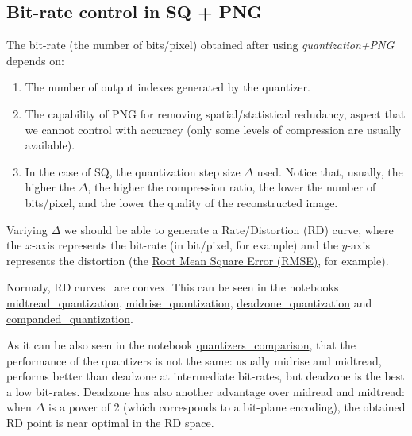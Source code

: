 
\subsection{Bit-rate control in SQ + PNG}

The bit-rate (the number of bits/pixel) obtained after using
\emph{quantization+PNG} depends on:
\begin{enumerate}
\item The number of output indexes generated by the quantizer.
\item The capability of PNG for removing spatial/statistical
  redudancy, aspect that we cannot control with accuracy (only some
  levels of compression are usually available).
\item In the case of SQ, the quantization step size $\Delta$
  used. Notice that, usually, the higher the $\Delta$, the higher the
  compression ratio, the lower the number of bits/pixel, and the lower
  the quality of the reconstructed image.
\end{enumerate}
Variying $\Delta$ we should be able to generate a Rate/Distortion (RD)
curve, where the $x$-axis represents the bit-rate (in bit/pixel, for
example) and the $y$-axis represents the distortion (the
\href{https://en.wikipedia.org/wiki/Root-mean-square_deviation}{Root
  Mean Square Error (RMSE)}, for example).

Normaly, RD curves~\cite{vruiz__information_theory} are convex. This
can be seen in the notebooks
\href{https://github.com/Sistemas-Multimedia/Sistemas-Multimedia.github.io/blob/master/contents/scalar_quantization/midtread.ipynb}{midtread\_quantization},
\href{https://github.com/Sistemas-Multimedia/Sistemas-Multimedia.github.io/blob/master/contents/scalar_quantization/midrise.ipynb}{midrise\_quantization},
\href{https://github.com/Sistemas-Multimedia/Sistemas-Multimedia.github.io/blob/master/contents/scalar_quantization/deadzone.ipynb}{deadzone\_quantization}
and
\href{https://github.com/Sistemas-Multimedia/Sistemas-Multimedia.github.io/blob/master/contents/scalar_quantization/companded.ipynb}{companded\_quantization}.

As it can be also seen in the notebook
\href{https://github.com/Sistemas-Multimedia/Sistemas-Multimedia.github.io/blob/master/contents/scalar_quantization/compare_quantizers.ipynb}{quantizers\_comparison},
that the performance of the quantizers is not the same: usually
midrise and midtread, performs better than deadzone at intermediate
bit-rates, but deadzone is the best a low bit-rates. Deadzone has also
another advantage over midread and midtread: when $\Delta$ is a power
of 2 (which corresponds to a bit-plane encoding), the obtained RD
point is near optimal in the RD space.

